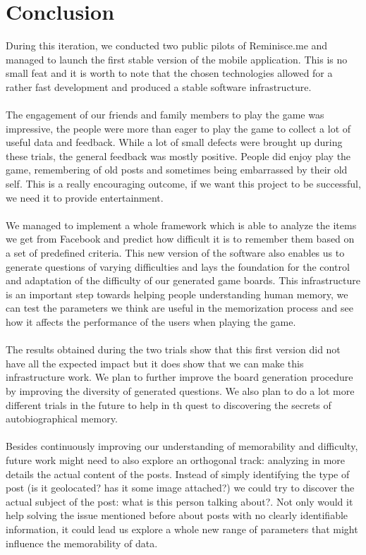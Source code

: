 \chapter{Conclusion}
During this iteration, we conducted two public pilots of Reminisce.me and managed to launch the first stable version of the mobile application. This is no small feat and it is worth to note that the chosen technologies allowed for a rather fast development and produced a stable software infrastructure.\\\\
The engagement of our friends and family members to play the game was impressive, the people were more than eager to play the game to collect a lot of useful data and feedback. While a lot of small defects were brought up during these trials, the general feedback was mostly positive. People did enjoy play the game, remembering of old posts and sometimes being embarrassed by their old self. This is a really encouraging outcome, if we want this project to be successful, we need it to provide entertainment.\\\\
We managed to implement a whole framework which is able to analyze the items we get from Facebook and predict how difficult it is to remember them based on a set of predefined criteria. This new version of the software also enables us to generate questions of varying difficulties and lays the foundation for the control and adaptation of the difficulty of our generated game boards. This infrastructure is an important step towards helping people understanding human memory, we can test the parameters we think are useful in the memorization process and see how it affects the performance of the users when playing the game.\\\\
The results obtained during the two trials show that this first version did not have all the expected impact but it does show that we can make this infrastructure work. We plan to further improve the board generation procedure by improving the diversity of generated questions. We also plan to do a lot more different trials in the future to help in th quest to discovering the secrets of autobiographical memory.\\\\
Besides continuously improving our understanding of memorability and difficulty, future work might need to also explore an orthogonal track: analyzing in more details the actual content of the posts. Instead of simply identifying the type of post (is it geolocated? has it some image attached?) we could try to discover the actual subject of the post: what is this person talking about?. Not only would it help solving the issue mentioned before about posts with no clearly identifiable information, it could lead us explore a whole new range of parameters that might influence the memorability of data.\\\\
